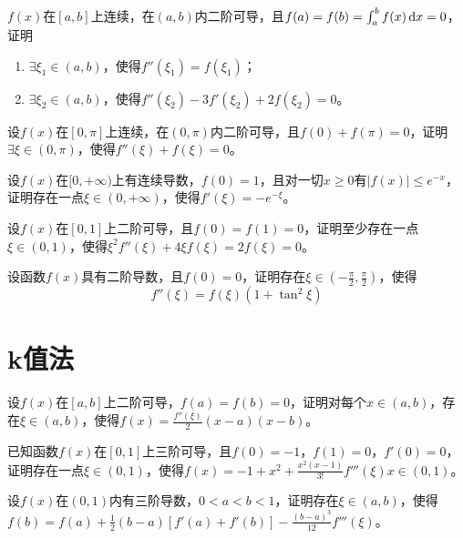 \begin{example}
	$f(x)$在$[a,b]$上连续，在$(a,b)$内二阶可导，且$f(a)=f(b)=\int_{a}^{b}f(x)\,\mathrm{d} x=0$，证明
	\begin{enumerate}
		\item $\exists\xi_1\in(a,b)$，使得$f''(\xi_1)=f(\xi_1)$；
		\item $\exists\xi_2\in(a,b)$，使得$f''(\xi_2)-3f'(\xi_2)+2f(\xi_2)=0$。
	\end{enumerate}
\end{example}

\begin{example}
	设$f(x)$在$[0,\pi]$上连续，在$(0,\pi)$内二阶可导，且$f(0)+f(\pi)=0$，证明$\exists\xi\in(0,\pi)$，使得$f''(\xi)+f(\xi)=0$。
\end{example}

\begin{example}
	设$f(x)$在$[0,+\infty)$上有连续导数，$f(0)=1$，且对一切$x\geqslant0$有$|f(x)|\leqslant e^{-x}$，证明存在一点$\xi\in(0,+\infty)$，使得$f'(\xi)=-e^{-\xi}$。
\end{example}

\begin{example}
	设$f(x)$在$[0,1]$上二阶可导，且$f(0)=f(1)=0$，证明至少存在一点$\xi\in(0,1)$，使得$\xi^2f''(\xi)+4\xi f(\xi)=2f(\xi)=0$。
\end{example}

\begin{example}
	设函数$f(x)$具有二阶导数，且$f(0)=0$，证明存在$\xi\in\left(-\frac{\pi}{2},\frac{\pi}{2}\right)$，使得\[f''(\xi)=f(\xi)(1+\tan^2\xi)\]
\end{example}

\section{k值法}

\begin{example}
	设$f(x)$在$[a,b]$上二阶可导，$f(a)=f(b)=0$，证明对每个$x\in(a,b)$，存在$\xi\in(a,b)$，使得$f(x)=\frac{f''(\xi)}{2}(x-a)(x-b)$。
\end{example}

\begin{example}
	已知函数$f(x)$在$[0,1]$上三阶可导，且$f(0)=-1$，$f(1)=0$，$f'(0)=0$，证明存在一点$\xi\in(0,1)$，使得$f(x)=-1+x^2+\frac{x^2(x-1)}{3!}f'''(\xi)x\in(0,1)$。
\end{example}

\begin{example}
	设$f(x)$在$(0,1)$内有三阶导数，$0<a<b<1$，证明存在$\xi\in(a,b)$，使得$f(b)=f(a)+\frac{1}{2}(b-a)[f'(a)+f'(b)]-\frac{(b-a)^3}{12}f'''(\xi)$。
\end{example}

